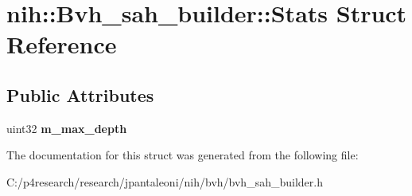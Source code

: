 \hypertarget{structnih_1_1_bvh__sah__builder_1_1_stats}{
\section{nih\-:\-:\-Bvh\-\_\-sah\-\_\-builder\-:\-:\-Stats \-Struct \-Reference}
\label{structnih_1_1_bvh__sah__builder_1_1_stats}
}
\subsection*{\-Public \-Attributes}
\begin{DoxyCompactItemize}
\item 
\hypertarget{structnih_1_1_bvh__sah__builder_1_1_stats_a6aa743ce80a25c76d3bb6e060f882cf1}{
uint32 {\bfseries m\-\_\-max\-\_\-depth}}
\label{structnih_1_1_bvh__sah__builder_1_1_stats_a6aa743ce80a25c76d3bb6e060f882cf1}

\end{DoxyCompactItemize}


\-The documentation for this struct was generated from the following file\-:\begin{DoxyCompactItemize}
\item 
\-C\-:/p4research/research/jpantaleoni/nih/bvh/bvh\-\_\-sah\-\_\-builder.\-h\end{DoxyCompactItemize}
